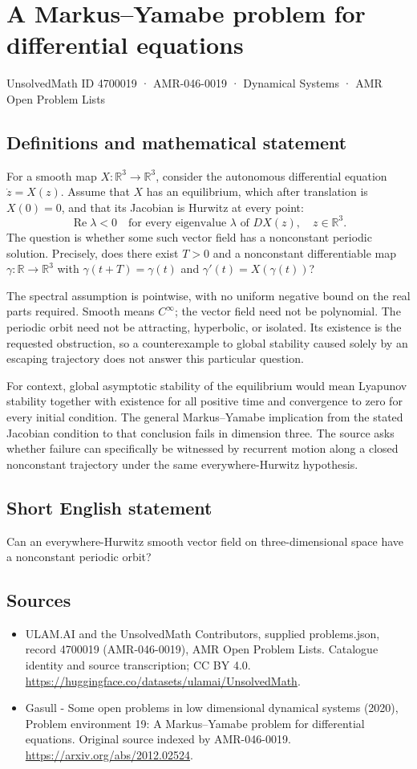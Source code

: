 \documentclass[11pt,a4paper]{article}
\begin{document}
\section*{A Markus–Yamabe problem for differential equations}\label{4700019}
{\small UnsolvedMath ID 4700019 · AMR-046-0019 · Dynamical Systems · AMR Open Problem Lists}
\subsection{Definitions and mathematical statement}
For a smooth map $X:\mathbb R^3\to\mathbb R^3$, consider the autonomous
differential equation $\dot z=X(z)$. Assume that $X$ has an equilibrium,
which after translation is $X(0)=0$, and that its Jacobian is Hurwitz at
every point:
\[
 \operatorname{Re}\lambda<0\quad
 \text{for every eigenvalue }\lambda\text{ of }DX(z),
 \quad z\in\mathbb R^3.
\]
The question is whether some such vector field has a nonconstant periodic
solution. Precisely, does there exist $T>0$ and a nonconstant differentiable
map $\gamma:\mathbb R\to\mathbb R^3$ with
$\gamma(t+T)=\gamma(t)$ and $\gamma'(t)=X(\gamma(t))$?

The spectral assumption is pointwise, with no uniform negative bound on
the real parts required. Smooth means $C^\infty$; the vector field need
not be polynomial. The periodic orbit need not be attracting, hyperbolic,
or isolated. Its existence is the requested obstruction, so a counterexample
to global stability caused solely by an escaping trajectory does not
answer this particular question.

For context, global asymptotic stability of the equilibrium would mean
Lyapunov stability together with existence for all positive time and
convergence to zero for every initial condition. The general
Markus–Yamabe implication from the stated Jacobian condition to that
conclusion fails in dimension three. The source asks whether failure can
specifically be witnessed by recurrent motion along a closed nonconstant
trajectory under the same everywhere-Hurwitz hypothesis.
\subsection{Short English statement}
Can an everywhere-Hurwitz smooth vector field on three-dimensional space have a nonconstant periodic orbit?
\subsection{Sources}
\begin{itemize}
\item[S1] ULAM.AI and the UnsolvedMath Contributors, supplied problems.json, record 4700019 (AMR-046-0019), AMR Open Problem Lists. Catalogue identity and source transcription; CC BY 4.0.
\url{https://huggingface.co/datasets/ulamai/UnsolvedMath}.
\item[S2] Gasull - Some open problems in low dimensional dynamical systems (2020), Problem environment 19: A Markus–Yamabe problem for differential equations. Original source indexed by AMR-046-0019.
\url{https://arxiv.org/abs/2012.02524}.
\end{itemize}
\end{document}
